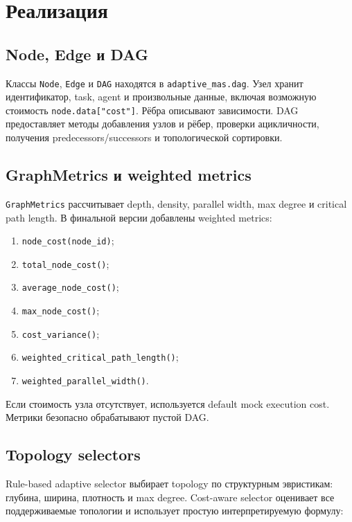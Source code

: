 \documentclass[12pt,a4paper]{report}
\newcommand{\code}[1]{\texttt{#1}}
\begin{document}
\chapter{Реализация}

\section{Node, Edge и DAG}

Классы \code{Node}, \code{Edge} и \code{DAG} находятся в \code{adaptive\_mas.dag}. Узел хранит идентификатор, task, agent и произвольные данные, включая возможную стоимость \code{node.data["cost"]}. Рёбра описывают зависимости. DAG предоставляет методы добавления узлов и рёбер, проверки ацикличности, получения predecessors/successors и топологической сортировки.

\section{GraphMetrics и weighted metrics}

\code{GraphMetrics} рассчитывает depth, density, parallel width, max degree и critical path length. В финальной версии добавлены weighted metrics:

\begin{enumerate}
  \item \code{node\_cost(node\_id)};
  \item \code{total\_node\_cost()};
  \item \code{average\_node\_cost()};
  \item \code{max\_node\_cost()};
  \item \code{cost\_variance()};
  \item \code{weighted\_critical\_path\_length()};
  \item \code{weighted\_parallel\_width()}.
\end{enumerate}

Если стоимость узла отсутствует, используется default mock execution cost. Метрики безопасно обрабатывают пустой DAG.

\section{Topology selectors}

Rule-based adaptive selector выбирает topology по структурным эвристикам: глубина, ширина, плотность и max degree. Cost-aware selector оценивает все поддерживаемые топологии и использует простую интерпретируемую формулу:
\end{document}
